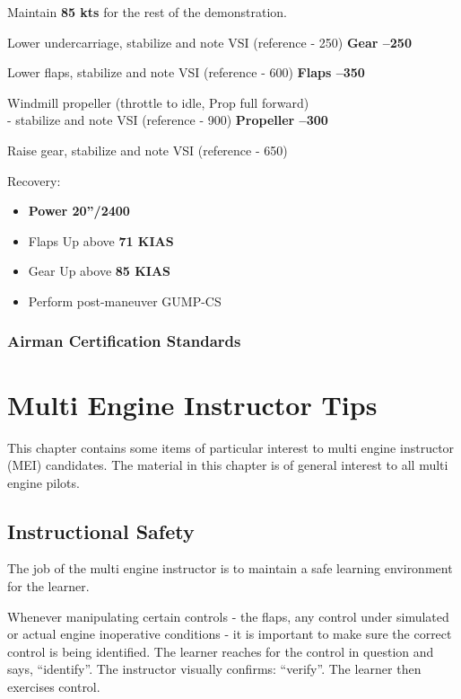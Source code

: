 {Maintain \textbf{85 kts} for the rest of the demonstration.

Lower undercarriage, stabilize and note VSI (reference - 250) \textbf{Gear –250}

Lower flaps, stabilize and note VSI (reference - 600) \textbf{Flaps –350}

Windmill propeller (throttle to idle, Prop full forward)\\
- stabilize and note VSI (reference - 900) \textbf{Propeller –300}

Raise gear, stabilize and note VSI (reference - 650)

Recovery:
\begin{itemize}[label={}]

\item \textbf{Power 20''/2400}
\item Flaps Up above \textbf{71 KIAS}
\item Gear Up above \textbf{85 KIAS}
\item Perform post-maneuver GUMP-CS
\end{itemize}

\subsection{Airman Certification Standards}
\newpage


\chapter{Multi Engine Instructor Tips}

This chapter contains some items of particular interest to multi engine instructor (MEI) candidates.
The material in this chapter is of general interest to all multi engine pilots.

\section{Instructional Safety}

The job of the multi engine instructor is to maintain a safe learning environment for the learner.

Whenever manipulating certain controls - the flaps, any control under simulated or actual engine inoperative conditions -
it is important to make sure the correct control is being identified. The learner reaches for the control in question and
says, ``identify''. The instructor visually confirms: ``verify''. The learner then exercises control.

}
